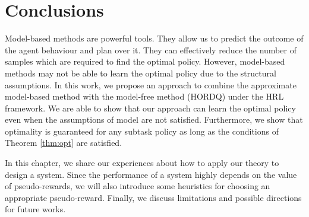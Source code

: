 \chapter{Conclusions}


Model-based methods are powerful tools. They allow us to predict the outcome 
of the agent behaviour and plan over it. They can effectively reduce the number of 
samples which are required to find the optimal policy.
However, model-based methods may not be able to learn the optimal
policy due to the structural assumptions.
In this work, we propose an approach to combine the approximate model-based method with the
model-free method (HORDQ) under the HRL framework. We are able to show that our approach
can learn the optimal policy even when the assumptions of model are not satisfied. Furthermore, we show that optimality
is guaranteed for any subtask policy as long as the conditions of Theorem \ref{thm:opt} are satisfied.


In this chapter, we share our experiences about how to apply our theory to design a system.
Since the performance of a system highly depends on the value of pseudo-rewards, we will also introduce
some heuristics for choosing an appropriate pseudo-reward.
Finally, we discuss limitations and possible directions for future works. 

